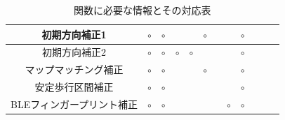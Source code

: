 \documentclass[Japanese]{dicomopapers}
\begin{document}
\begin{table}[ht]
{\begin{tabular}{|c|c|c|c|c|c|c|c|c|c|c|c|}
			初期方向補正1        & \multicolumn{1}{c|}{$\circ$} & \multicolumn{1}{c|}{$\circ$} &                              &                              & \multicolumn{1}{c|}{$\circ$}                                                                                  &           &                              & \multicolumn{1}{c|}{$\circ$} &    &                              &    \\ \hline
			初期方向補正2        & \multicolumn{1}{c|}{$\circ$} & \multicolumn{1}{c|}{$\circ$} & \multicolumn{1}{c|}{$\circ$} & \multicolumn{1}{c|}{$\circ$} &                                                                                                               &           &                              & \multicolumn{1}{c|}{$\circ$} &    &                              &    \\ \hline
			マップマッチング補正     & \multicolumn{1}{c|}{$\circ$} & \multicolumn{1}{c|}{$\circ$} &                              &                              & \multicolumn{1}{c|}{$\circ$}                                                                                  &           &                              & \multicolumn{1}{c|}{$\circ$} &    &                              &    \\ \hline
			安定歩行区間補正       & \multicolumn{1}{c|}{$\circ$} & \multicolumn{1}{c|}{$\circ$} &                              &                              &                                                                                                               &           &                              & \multicolumn{1}{c|}{$\circ$} &    &                              &    \\ \hline
			BLEフィンガープリント補正 & \multicolumn{1}{c|}{$\circ$} & \multicolumn{1}{c|}{$\circ$} &                              &                              &                                                                                                               &           & \multicolumn{1}{c|}{$\circ$} & \multicolumn{1}{c|}{$\circ$} &    &                              &    \\ \hline
		\end{tabular}
	}
	\caption{関数に必要な情報とその対応表} \label{}
\end{table}
\end{document}
